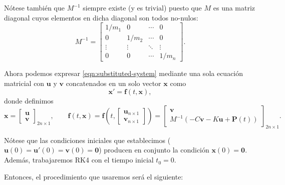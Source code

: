 Nótese también que \(M^{-1}\) siempre existe (y es trivial) puesto que \(M\) es una matriz diagonal cuyos elementos en dicha diagonal son todos no-nulos:
\[
    M^{-1} = \begin{bmatrix}
        1/m_1 & 0 & \cdots & 0 \\
        0 & 1/m_2 & \cdots & 0 \\
        \vdots & \vdots & \ddots & \vdots \\
        0 & 0 & \cdots & 1/m_n
    \end{bmatrix}
.\]

Ahora podemos expresar \eqref{eqn:substituted-system} mediante una sola ecuación matricial con \(\mathbf{u}\) y \(\mathbf{v}\) concatenados en un solo vector \(\mathbf{x}\) como
\begin{equation}\label{eqn:rk4-ready}
    \mathbf{x}' = \mathbf{f}(t, \mathbf{x})
,\end{equation}
donde definimos
\[
    \mathbf{x} = \begin{bmatrix} \mathbf{u} \\ \mathbf{v} \end{bmatrix}_{2n \times 1},
    \qquad
    \mathbf{f}(t, \mathbf{x}) = \mathbf{f}\left(t, \begin{bmatrix} \mathbf{u}_{n \times 1} \\ \mathbf{v}_{n \times 1} \end{bmatrix}\right) = \begin{bmatrix}
        \mathbf{v} \\
        M^{-1}(-C\mathbf{v} - K\mathbf{u} + \mathbf{P}(t))
    \end{bmatrix}_{2n \times 1}
.\]

Nótese que las condiciones iniciales que establecimos (\(\mathbf{u}(0) = \mathbf{u}'(0) = \mathbf{v}(0) = \mathbf{0}\)) producen en conjunto la condición \(\mathbf{x}(0) = \mathbf{0}\). Además, trabajaremos RK4 con el tiempo inicial \(t_0 = 0\).

Entonces, el procedimiento que usaremos será el siguiente:

